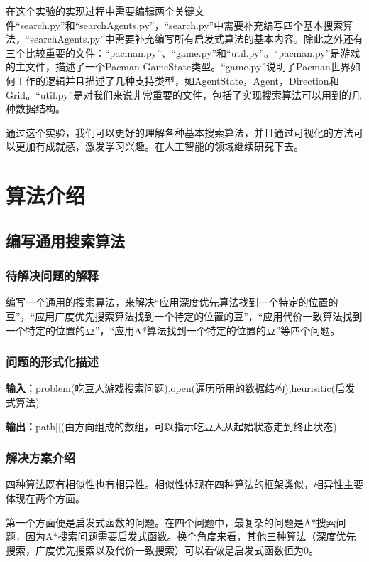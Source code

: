 \documentclass[forprint]{WHUBachelor}
\begin{document}
在这个实验的实现过程中需要编辑两个关键文件“search.py”和“searchAgents.py”，“search.py”中需要补充编写四个基本搜索算法，“searchAgents.py”中需要补充编写所有启发式算法的基本内容。除此之外还有三个比较重要的文件：“pacman.py”、“game.py”和“util.py”。“pacman.py”是游戏的主文件，描述了一个Pacman GameState类型。“game.py”说明了Pacman世界如何工作的逻辑并且描述了几种支持类型，如AgentState，Agent，Direction和Grid。“util.py”是对我们来说非常重要的文件，包括了实现搜索算法可以用到的几种数据结构。

通过这个实验，我们可以更好的理解各种基本搜索算法，并且通过可视化的方法可以更加有成就感，激发学习兴趣。在人工智能的领域继续研究下去。

\chapter{算法介绍}

\section{编写通用搜索算法}

\subsection{待解决问题的解释}

编写一个通用的搜索算法，来解决“应用深度优先算法找到一个特定的位置的豆”，“应用广度优先搜索算法找到一个特定的位置的豆”，“应用代价一致算法找到一个特定的位置的豆”，“应用A*算法找到一个特定的位置的豆”等四个问题。

\subsection{问题的形式化描述}

\textbf{输入：}problem(吃豆人游戏搜索问题),open(遍历所用的数据结构),heurisitic(启发式算法)

\textbf{输出：}path[](由方向组成的数组，可以指示吃豆人从起始状态走到终止状态)

\subsection{解决方案介绍}

四种算法既有相似性也有相异性。相似性体现在四种算法的框架类似，相异性主要体现在两个方面。

第一个方面便是启发式函数的问题。在四个问题中，最复杂的问题是A*搜索问题，因为A*搜索问题需要启发式函数。换个角度来看，其他三种算法（深度优先搜索，广度优先搜索以及代价一致搜索）可以看做是启发式函数恒为0。
\end{document}
